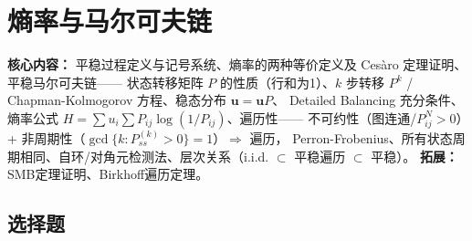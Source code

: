 \documentclass[12pt,a4paper]{ctexart}
\begin{document}
\newpage

\section{熵率与马尔可夫链}

\begin{notetested}
\textbf{核心内容：} 平稳过程定义与记号系统、熵率的两种等价定义及 Ces\`{a}ro 定理证明、平稳马尔可夫链——
状态转移矩阵 $P$ 的性质（行和为1）、$k$ 步转移 $P^k$ / Chapman-Kolmogorov 方程、稳态分布 $\mathbf{u}=\mathbf{u}P$、
Detailed Balancing 充分条件、熵率公式 $H=\sum u_i\sum P_{ij}\log(1/P_{ij})$、遍历性——
不可约性（图连通/$P^N_{ij}>0$）+ 非周期性（$\gcd\{k:P^{(k)}_{ss}>0\}=1$）$\Rightarrow$ 遍历，
Perron-Frobenius、所有状态周期相同、自环/对角元检测法、层次关系（i.i.d. $\subset$ 平稳遍历 $\subset$ 平稳）。
\textbf{拓展：} SMB定理证明、Birkhoff遍历定理。
\end{notetested}

\subsection*{选择题}
\end{document}
